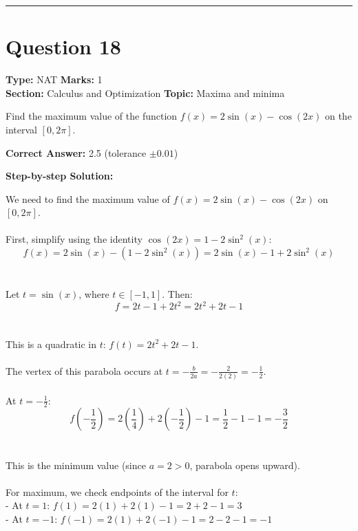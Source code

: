 \documentclass[11pt]{article}
\begin{document}
\vspace{0.8em}
\hrule
\vspace{0.4em}
\section*{Question 18}
\textbf{Type:} NAT \hfill \textbf{Marks:} 1\\
\textbf{Section:} Calculus and Optimization \hfill \textbf{Topic:} Maxima and minima

Find the maximum value of the function \(f(x) = 2\sin(x) - \cos(2x)\) on the interval \([0, 2\pi]\).



\textbf{Correct Answer:} 2.5 (tolerance \(\pm 0.01\))

\textbf{Step-by-step Solution:}

We need to find the maximum value of \(f(x) = 2\sin(x) - \cos(2x)\) on \([0, 2\pi]\).\\
\\
First, simplify using the identity \(\cos(2x) = 1 - 2\sin^2(x)\):\\
\[f(x) = 2\sin(x) - (1 - 2\sin^2(x)) = 2\sin(x) - 1 + 2\sin^2(x)\]\\
\\
Let \(t = \sin(x)\), where \(t \in [-1, 1]\). Then:\\
\[f = 2t - 1 + 2t^2 = 2t^2 + 2t - 1\]\\
\\
This is a quadratic in \(t\): \(f(t) = 2t^2 + 2t - 1\).\\
\\
The vertex of this parabola occurs at \(t = -\frac{b}{2a} = -\frac{2}{2(2)} = -\frac{1}{2}\).\\
\\
At \(t = -\frac{1}{2}\):\\
\[f\left(-\frac{1}{2}\right) = 2\left(\frac{1}{4}\right) + 2\left(-\frac{1}{2}\right) - 1 = \frac{1}{2} - 1 - 1 = -\frac{3}{2}\]\\
\\
This is the minimum value (since \(a = 2 > 0\), parabola opens upward).\\
\\
For maximum, we check endpoints of the interval for \(t\):\\
- At \(t = 1\): \(f(1) = 2(1) + 2(1) - 1 = 2 + 2 - 1 = 3\)\\
- At \(t = -1\): \(f(-1) = 2(1) + 2(-1) - 1 = 2 - 2 - 1 = -1\)\\
\\
\end{document}
